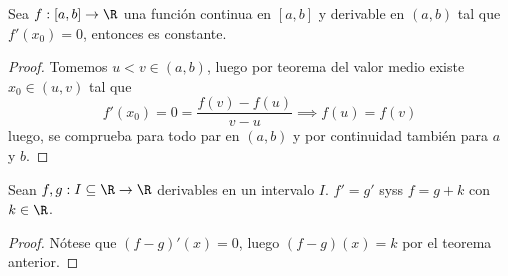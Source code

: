 \documentclass[11pt,oneside,a4paper]{book}
\begin{document}
\begin{thm}
Sea $f:[a,b]\rightarrow\R$ una función continua en $[a,b]$ y derivable en $(a,b)$ tal que $f'(x_0)=0$, entonces es constante.
\end{thm}
\begin{proof}
Tomemos $u\lt v\in(a,b)$, luego por teorema del valor medio existe $x_0\in(u,v)$ tal que
$$f'(x_0)=0=\frac{f(v)-f(u)}{v-u}\implies f(u)=f(v)$$
luego, se comprueba para todo par en $(a,b)$ y por continuidad también para $a$ y $b$.
\end{proof}
\begin{thm}
Sean $f,g:I\subseteq\R\rightarrow\R$ derivables en un intervalo $I$. $f'=g'$ syss $f=g+k$ con $k\in\R$.
\end{thm}
\begin{proof}
Nótese que $(f-g)'(x)=0$, luego $(f-g)(x)=k$ por el teorema anterior.
\end{proof}
\end{document}
